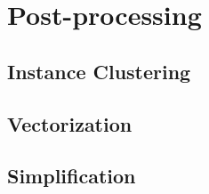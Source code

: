 \chapter{Post-processing}%
\label{chap:post-processing}

\section{Instance Clustering}


\section{Vectorization}


\section{Simplification}

